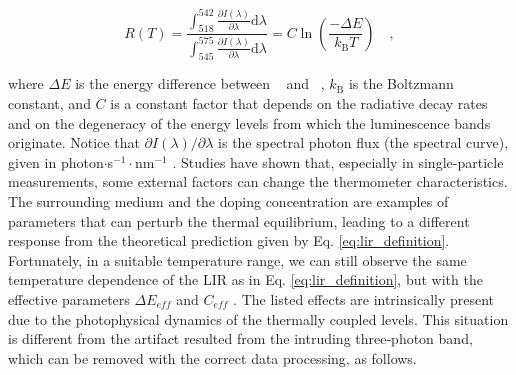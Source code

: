 \documentclass[journal=jacsat,manuscript=article, layout=twocolumn]{achemso}
\newcommand*\twoHeleven[1]{$^2$H$_{11/2}$}
\newcommand*\fourSthree[1]{$^4$S$_{3/2}$}
\begin{document}
\begin{equation} \label{eq:lir_definition}
R(T) = \frac{\int_{518}^{542} \frac{\partial I(\lambda)}{\partial \lambda} \mathrm{d}\lambda}{\int_{545}^{575} \frac{\partial I(\lambda)}{\partial \lambda} \mathrm{d}\lambda} = C \ln\left( \frac{-\Delta E}{k_\mathrm{B}T} \right) \quad ,
\end{equation}

\noindent where $\Delta E$ is the energy difference between \twoHeleven~ and \fourSthree~, $k_\mathrm{B}$ is the Boltzmann constant, and $C$ is a constant factor that depends on the radiative decay rates and on the degeneracy of the energy levels from which the luminescence bands originate. Notice that $\partial I(\lambda)/\partial \lambda$ is the spectral photon flux (the spectral curve), given in photon$\cdot$s$^{-1}\cdot$nm$^{-1}$ \cite{Suta_2020}. Studies have shown that, especially in single-particle measurements, some external factors can change the thermometer characteristics. The surrounding medium \cite{Galindo_2021, Galindo_2021_corr} and the doping concentration \cite{Suta2_2020} are examples of parameters that can perturb the thermal equilibrium, leading to a different response from the theoretical prediction given by Eq. \eqref{eq:lir_definition}. Fortunately, in a suitable temperature range, we can still observe the same temperature dependence of the LIR as in Eq. \eqref{eq:lir_definition}, but with the effective parameters $\Delta E_{eff}$ and $C_{eff}$ \cite{Goncalves_2021, Galvao_2021}. The listed effects are intrinsically present due to the photophysical dynamics of the thermally coupled levels. This situation is different from the artifact resulted from the intruding three-photon band, which can be removed with the correct data processing, as follows.
\end{document}
